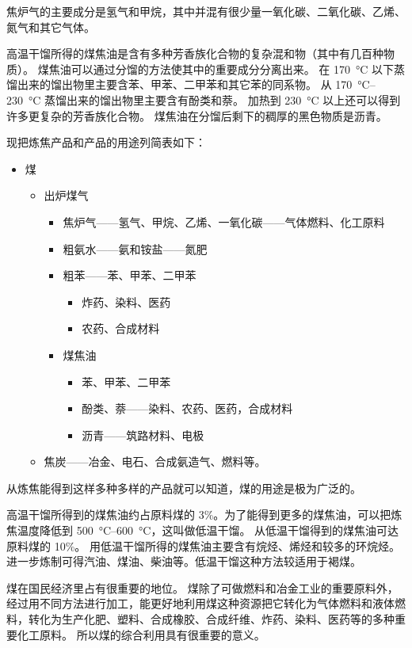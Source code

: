 焦炉气的主要成分是氢气和甲烷，其中并混有很少量一氧化碳、二氧化碳、乙烯、氮气和其它气体。

高温干馏所得的煤焦油是含有多种芳香族化合物的复杂混和物（其中有几百种物质）。
煤焦油可以通过分馏的方法使其中的重要成分分离出来。
在 \qty{170}{\celsius} 以下蒸馏出来的馏出物里主要含苯、甲苯、二甲苯和其它苯的同系物。
从 \qtyrange{170}{230}{\celsius} 蒸馏出来的馏出物里主要含有酚类和萘。
加热到 \qty{230}{\celsius} 以上还可以得到许多更复杂的芳香族化合物。
煤焦油在分馏后剩下的稠厚的黑色物质是沥青。

现把炼焦产品和产品的用途列简表如下：
\begin{itemize}
  \item 煤
  \begin{itemize}
    \item 出炉煤气
    \begin{itemize}
      \item 焦炉气——氢气、甲烷、乙烯、一氧化碳——气体燃料、化工原料
      \item 粗氨水——氨和铵盐——氮肥
      \item 粗苯——苯、甲苯、二甲苯
      \begin{itemize}
        \item 炸药、染料、医药
        \item 农药、合成材料
      \end{itemize}
      \item 煤焦油
      \begin{itemize}
        \item 苯、甲苯、二甲苯
        \item 酚类、萘——染料、农药、医药，合成材料
        \item 沥青——筑路材料、电极
      \end{itemize}
    \end{itemize}
    \item 焦炭——冶金、电石、合成氨造气、燃料等。
  \end{itemize}
\end{itemize}


从炼焦能得到这样多种多样的产品就可以知道，煤的用途是极为广泛的。

高温干馏所得到的煤焦油约占原料煤的 3\%。为了能得到更多的煤焦油，可以把炼焦温度降低到 \qtyrange{500}{600}{\celsius}，这叫做低温干馏。
从低温干馏得到的煤焦油可达原料煤的 10\%。
用低温干馏所得的煤焦油主要含有烷烃、烯烃和较多的环烷烃。
进一步炼制可得汽油、煤油、柴油等。低温干馏这种方法较适用于褐煤。

煤在国民经济里占有很重要的地位。
煤除了可做燃料和冶金工业的重要原料外，经过用不同方法进行加工，能更好地利用煤这种资源把它转化为气体燃料和液体燃料，转化为生产化肥、塑料、合成橡胶、合成纤维、炸药、染料、医药等的多种重要化工原料。
所以煤的综合利用具有很重要的意义。

